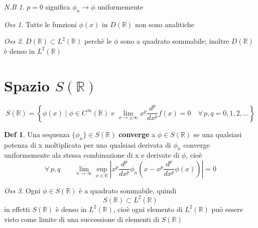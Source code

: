 \documentclass[a4paper,11pt]{report}
\theoremstyle{remark}
\newtheorem*{oss}{Oss}
\newtheorem*{nb}{N.B}
\theoremstyle{definition}
\newtheorem*{Def}{Def}
\newcommand{\R}{\mathbb{R}}
\begin{document}
\begin{nb}
	$p=0$ significa $\phi_n \to \phi $ uniformemente
\end{nb}

\begin{oss}
	Tutte le funzioni $\phi(x)$ in $D(\R)$ non sono analitiche
\end{oss}

\begin{oss}
	$D(\R)\subset L^2(\R)$ perchè le $\phi$ sono a quadrato sommabile; inoltre $D(\R)$ è denso in $L^2(\R)$
\end{oss}

\section{Spazio \texorpdfstring{$S(\R)$}{U}}

\begin{equation*}
	S(\R) = \left\{\phi(x) \;| \; \phi \in C^\infty(\R) \text{ e } \lim_{x\to \pm\infty} x^p \frac{d^p}{dx^p}f(x)=0 \quad  \forall \, p,q = 0,1,2,\dots \right\}
\end{equation*}

\begin{Def}
	Una sequenza $\{\phi_n\} \in S(\R)$ \textbf{converge} a $\phi \in S(\R)$ se una qualsiasi potenza di x moltiplicata per una qualsiasi derivata di $\phi_n$ converge uniformemente ala stessa combinazione di x e derivate di $\phi$, cioè
	\begin{equation*}
		\forall \, p,q \qquad \lim_{n\to\infty} \sup_{x\in\R} \left|x^p \frac{d^p}{dx^p}\phi_n(x - x^p\frac{d^p}{dx^p}\phi(x))\right| =0
	\end{equation*}
\end{Def}

\begin{oss}
	Ogni $\phi\in S(\R)$ è a quadrato sommabile, quindi 
	\begin{equation*}
		S(\R) \subset L^2(\R)
	\end{equation*}
	in effetti $S(\R)$ è denso in $L^2(\R)$, cioè ogni elemento di $L^2(\R)$ può essere visto come limite di una successione di elementi di $S(\R)$
\end{oss}
\end{document}
